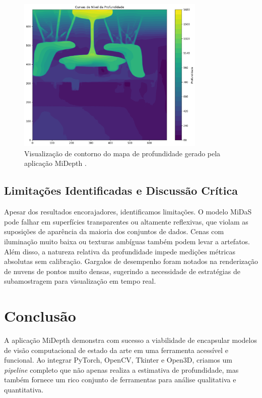 \documentclass{SBCbookchapter}
\newcommand{\nomeProjeto}{MiDepth }
\begin{document}
    \begin{figure}[h!]
        \centering
        \includegraphics[width=0.8\textwidth]{
            ../../src/assets/output/contour_visualization_20250622_182710.png
        }
        \caption{Visualização de contorno do mapa de profundidade gerado pela
        aplicação \nomeProjeto.}
        \label{fig:contour_viz}
    \end{figure}

    \subsection{Limitações Identificadas e Discussão Crítica}
    Apesar dos resultados encorajadores, identificamos limitações. O modelo MiDaS pode falhar em superfícies transparentes ou altamente reflexivas, que violam as suposições de aparência da maioria dos conjuntos de dados. Cenas com iluminação muito baixa ou texturas ambíguas também podem levar a artefatos. Além disso, a natureza relativa da profundidade impede medições métricas absolutas sem calibração. Gargalos de desempenho foram notados na renderização de nuvens de pontos muito densas, sugerindo a necessidade de estratégias de subamostragem para visualização em tempo real.

    \section{Conclusão}
    A aplicação \nomeProjeto demonstra com sucesso a viabilidade de encapsular modelos de visão computacional de estado da arte em uma ferramenta acessível e funcional. Ao integrar PyTorch, OpenCV, Tkinter e Open3D, criamos um \textit{pipeline} completo que não apenas realiza a estimativa de profundidade, mas também fornece um rico conjunto de ferramentas para análise qualitativa e quantitativa.
\end{document}
